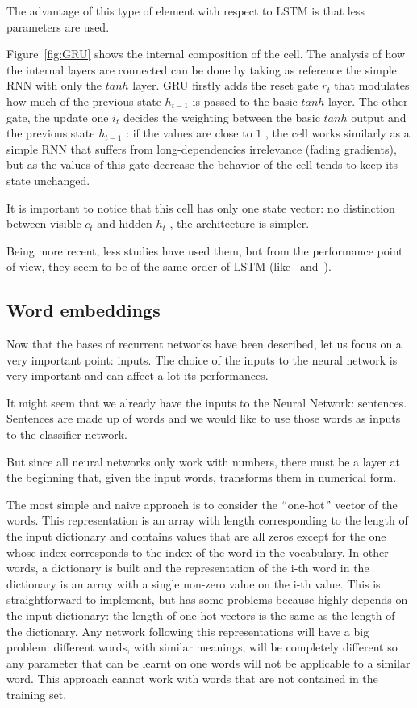 The advantage of this type of element with respect to LSTM is that less parameters are used.

Figure~\ref{fig:GRU} shows the internal composition of the cell. The analysis of how the internal layers are connected can be done by taking as reference the simple RNN with only the  \( tanh \) layer. GRU firstly adds the reset gate  \( r_{t} \) that modulates how much of the previous state  \( h_{t-1} \) is passed to the basic  \( tanh \) layer. The other gate, the update one  \( i_{t} \) decides the weighting between the basic  \( tanh \) output and the previous state  \( h_{t-1} \) : if the values are close to  \( 1 \) , the cell works similarly as a simple RNN that suffers from long-dependencies irrelevance (fading gradients), but as the values of this gate decrease the behavior of the cell tends to keep its state unchanged.

It is important to notice that this cell has only one state vector: no distinction between visible  \( c_{t} \) and hidden  \( h_{t} \) , the architecture is simpler.

Being more recent, less studies have used them, but from the performance point of view, they seem to be of the same order of LSTM (like~\cite{jozefowicz2015empirical} and~\cite{chung2014empirical}).

\subsection{Word embeddings}
\label{soaWordEmbeddings}

Now that the bases of recurrent networks have been described, let us focus on a very important point: inputs. The choice of the inputs to the neural network is very important and can affect a lot its performances.

It might seem that we already have the inputs to the Neural Network: sentences. Sentences are made up of words and we would like to use those words as inputs to the classifier network.

But since all neural networks only work with numbers, there must be a layer at the beginning that, given the input words, transforms them in numerical form.

The most simple and naive approach is to consider the $``$one-hot$"$  vector of the words. This representation is an array with length corresponding to the length of the input dictionary and contains values that are all zeros except for the one whose index corresponds to the index of the word in the vocabulary. In other words, a dictionary is built and the representation of the i-th word in the dictionary is an array with a single non-zero value on the i-th value. This is straightforward to implement, but has some problems because highly depends on the input dictionary: the length of one-hot vectors is the same as the length of the dictionary. Any network following this representations will have a big problem: different words, with similar meanings, will be completely different so any parameter that can be learnt on one words will not be applicable to a similar word. This approach cannot work with words that are not contained in the training set.


